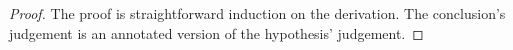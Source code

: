 \begin{proof}
  The proof is straightforward induction on the derivation. The conclusion's judgement
  is an annotated version of the hypothesis' judgement.
\end{proof}

% 

